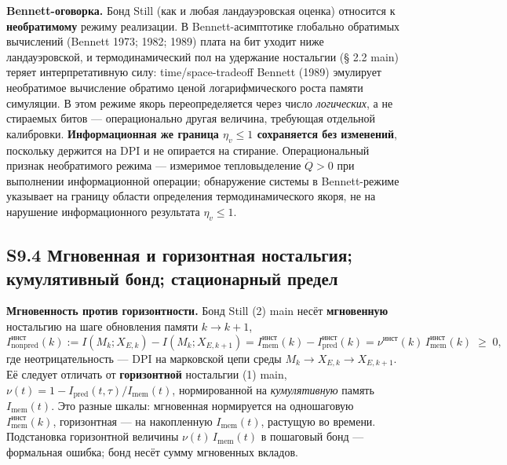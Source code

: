 \documentclass[pdflatex,sn-mathphys-ay]{sn-jnl}
\begin{document}
\textbf{Bennett-оговорка.} Бонд Still (как и любая ландауэровская оценка) относится к \textbf{необратимому} режиму реализации. В Bennett-асимптотике глобально обратимых вычислений (Bennett 1973; 1982; 1989) плата на бит уходит ниже ландауэровской, и термодинамический пол на удержание ностальгии (§ 2.2 main) теряет интерпретативную силу: time/space-tradeoff Bennett (1989) эмулирует необратимое вычисление обратимо ценой логарифмического роста памяти симуляции. В этом режиме якорь переопределяется через число \emph{логических}, а не стираемых битов --- операционально другая величина, требующая отдельной калибровки. \textbf{Информационная же граница \(\eta_v \le 1\) сохраняется без изменений}, поскольку держится на DPI и не опирается на стирание. Операциональный признак необратимого режима --- измеримое тепловыделение \(\dot Q > 0\) при выполнении информационной операции; обнаружение системы в Bennett-режиме указывает на границу области определения термодинамического якоря, не на нарушение информационного результата \(\eta_v \le 1\).



\subsection*{S9.4 Мгновенная и горизонтная ностальгия; кумулятивный бонд; стационарный предел}\label{s9.4-ux43cux433ux43dux43eux432ux435ux43dux43dux430ux44f-ux438-ux433ux43eux440ux438ux437ux43eux43dux442ux43dux430ux44f-ux43dux43eux441ux442ux430ux43bux44cux433ux438ux44f-ux43aux443ux43cux443ux43bux44fux442ux438ux432ux43dux44bux439-ux431ux43eux43dux434-ux441ux442ux430ux446ux438ux43eux43dux430ux440ux43dux44bux439-ux43fux440ux435ux434ux435ux43b}



\textbf{Мгновенность против горизонтности.} Бонд Still (2) main несёт \textbf{мгновенную} ностальгию на шаге обновления памяти \(k \to k+1\), \[I_{\text{nonpred}}^{\text{инст}}(k) := I(M_k; X_{E,k}) - I(M_k; X_{E,k+1}) = I_{\text{mem}}^{\text{инст}}(k) - I_{\text{pred}}^{\text{инст}}(k) = \nu^{\text{инст}}(k)\, I_{\text{mem}}^{\text{инст}}(k) \;\ge\; 0,\] где неотрицательность --- DPI на марковской цепи среды \(M_k \to X_{E,k} \to X_{E,k+1}\). Её следует отличать от \textbf{горизонтной} ностальгии (1) main, \(\nu(t) = 1 - I_{\text{pred}}(t,\tau)/I_{\text{mem}}(t)\), нормированной на \emph{кумулятивную} память \(I_{\text{mem}}(t)\). Это разные шкалы: мгновенная нормируется на одношаговую \(I_{\text{mem}}^{\text{инст}}(k)\), горизонтная --- на накопленную \(I_{\text{mem}}(t)\), растущую во времени. Подстановка горизонтной величины \(\nu(t)\, I_{\text{mem}}(t)\) в пошаговый бонд --- формальная ошибка; бонд несёт сумму мгновенных вкладов.
\end{document}
